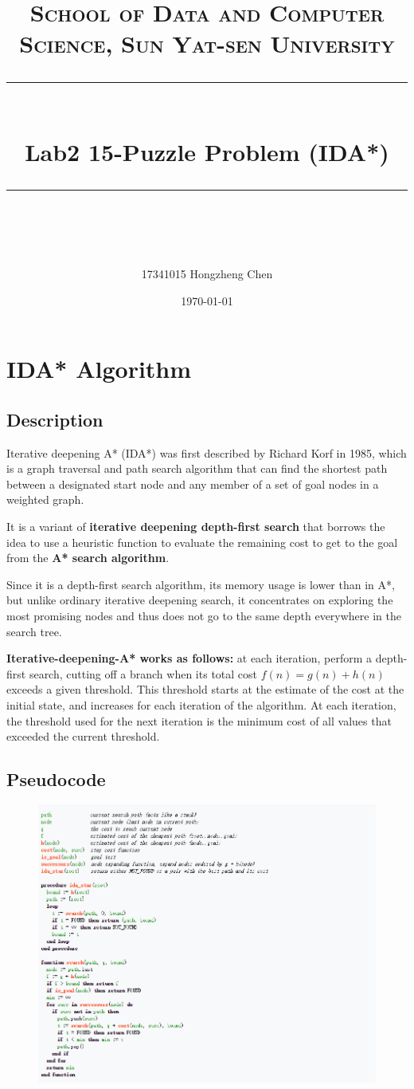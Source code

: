 \documentclass[a4paper, 11pt]{article}
\title{	
\normalfont \normalsize
\textsc{School of Data and Computer Science, Sun Yat-sen University} \\ [25pt] %
\rule{\textwidth}{0.5pt} \\[0.4cm] %
\huge  Lab2 15-Puzzle Problem (IDA*)\\ %
\rule{\textwidth}{2pt} \\[0.5cm] %
\author{17341015 Hongzheng Chen}
\date{\normalsize\today}
}
\begin{document}
\maketitle
\tableofcontents
\newpage

\section{IDA* Algorithm}
\subsection{Description}
Iterative deepening A* (IDA*) was first described by Richard Korf in 1985, which is a graph traversal and path search algorithm that can find the shortest path between a designated start node and any member of a set of goal nodes in a weighted graph. 

It is a variant of \textbf{iterative deepening depth-first search} that borrows the idea to use a heuristic function to evaluate the remaining cost to get to the goal from the \textbf{A* search algorithm}. 

Since it is a depth-first search algorithm, its memory usage is lower than in A*, but unlike ordinary iterative deepening search, it concentrates on exploring the most promising nodes and thus does not go to the same depth everywhere in the search tree. 

\textbf{Iterative-deepening-A* works as follows:} at each iteration, perform a depth-first search, cutting off a branch when its total cost $f(n)=g(n)+h(n)$ exceeds a given threshold. This threshold starts at the estimate of the cost at the initial state, and increases for each iteration of the algorithm. At each iteration, the threshold used for the next iteration is the minimum cost of all values that exceeded the current threshold.
\subsection{Pseudocode}
\begin{figure}[ht]
\centering
\includegraphics[width=17.3cm]{fig/code}
\end{figure}
\end{document}
